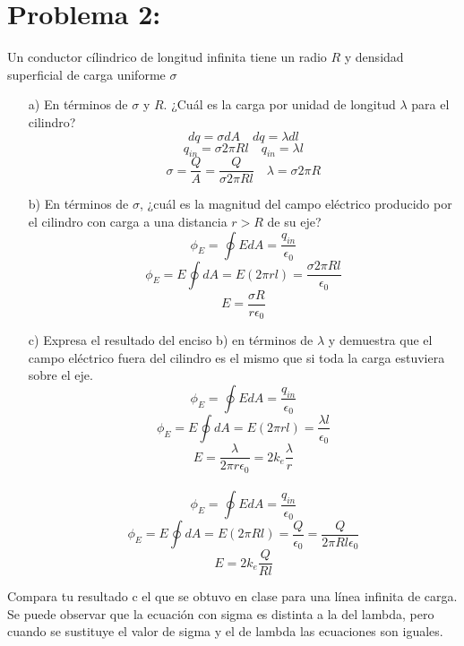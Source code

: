 \documentclass[12pt]{article}
\begin{document}
		\section{Problema 2:}\label{sec:Problema2}
			Un conductor cílindrico de longitud infinita tiene un radio $ R $ y densidad superficial
			de carga uniforme $ \sigma $
			\begin{enumerate}
				\item[a)] En términos de $ \sigma $ y $ R $. ¿Cuál es la carga por unidad de longitud 
						$ \lambda $ para el cilindro?
						$$ dq = \sigma dA \quad dq = \lambda dl $$
						$$ q_{in} = \sigma 2 \pi R l \quad q_{in} = \lambda l  $$
						$$ \sigma = \frac{Q}{A} = \frac{Q}{\sigma 2 \pi R l} \quad \lambda = \sigma 2 \pi R $$
				\item[b)] En términos de $  \sigma $, ¿cuál es la magnitud del campo eléctrico producido 
						por el cilindro con carga a una distancia $ r > R $ de su eje?
						$$ \phi_E = \oint EdA = \frac{q_{in}}{\epsilon_0} $$
						$$ \phi_E = E \oint dA = E(2 \pi r l) = \frac{\sigma 2 \pi R l}{\epsilon_0} $$
						$$ E = \frac{\sigma R}{r \epsilon_0} $$
				\item[c)] Expresa el resultado del enciso b) en términos de $ \lambda $ y demuestra que el campo
						eléctrico fuera del cilindro es el mismo que si toda la carga estuviera sobre el eje.
						$$ \phi_E = \oint EdA = \frac{q_{in}}{\epsilon_0} $$
						$$ \phi_E = E \oint dA = E(2 \pi r l) = \frac{\lambda l}{\epsilon_0} $$
						$$ E = \frac{\lambda}{2 \pi r \epsilon_0} =  2k_e \frac{\lambda}{r} $$ \\
						$$ \phi_E = \oint EdA = \frac{q_{in}}{\epsilon_0} $$
						$$ \phi_E = E \oint dA =  E(2 \pi R l) = \frac{Q}{\epsilon_0} = \frac{Q}{2 \pi R l \epsilon_0} $$
						$$ E = 2 k_e \frac{Q}{Rl} $$
			\end{enumerate}
			Compara tu resultado c el que se obtuvo en clase para una línea infinita de carga. \\
			Se puede observar que la ecuación con sigma es distinta a la del lambda, pero cuando se 
			sustituye el valor de sigma y el de lambda las ecuaciones son iguales.
\end{document}
